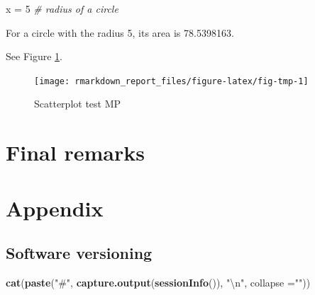 \documentclass[
  12pt,
]{article}
\newenvironment{Shaded}{\begin{snugshade}}{\end{snugshade}}
\newcommand{\CharTok}[1]{\textcolor[rgb]{0.31,0.60,0.02}{#1}}
\newcommand{\CommentTok}[1]{\textcolor[rgb]{0.56,0.35,0.01}{\textit{#1}}}
\newcommand{\DataTypeTok}[1]{\textcolor[rgb]{0.13,0.29,0.53}{#1}}
\newcommand{\DecValTok}[1]{\textcolor[rgb]{0.00,0.00,0.81}{#1}}
\newcommand{\KeywordTok}[1]{\textcolor[rgb]{0.13,0.29,0.53}{\textbf{#1}}}
\newcommand{\NormalTok}[1]{#1}
\newcommand{\StringTok}[1]{\textcolor[rgb]{0.31,0.60,0.02}{#1}}
\begin{document}
\begin{Shaded}
\begin{Highlighting}[]
\NormalTok{x =}\StringTok{ }\DecValTok{5}  \CommentTok{# radius of a circle}
\end{Highlighting}
\end{Shaded}

For a circle with the radius 5,
its area is 78.5398163.

See Figure \ref{fig:fig-tmp}.

\begin{figure}[ht]

{\centering \texttt{[image: rmarkdown\_report\_files/figure-latex/fig-tmp-1]} 

}

\caption{Scatterplot test MP}\label{fig:fig-tmp}
\end{figure}

\hypertarget{final-remarks}{%
\section{Final remarks}\label{final-remarks}}

\newpage

\hypertarget{appendix}{%
\section{Appendix}\label{appendix}}

\hypertarget{software-versioning}{%
\subsection{Software versioning}\label{software-versioning}}

\begin{Shaded}
\begin{Highlighting}[]
\KeywordTok{cat}\NormalTok{(}\KeywordTok{paste}\NormalTok{(}\StringTok{"#"}\NormalTok{, }\KeywordTok{capture.output}\NormalTok{(}\KeywordTok{sessionInfo}\NormalTok{()), }\StringTok{"}\CharTok{\textbackslash{}n}\StringTok{"}\NormalTok{, }\DataTypeTok{collapse =}\StringTok{""}\NormalTok{)) }
\end{Highlighting}
\end{Shaded}
\end{document}
